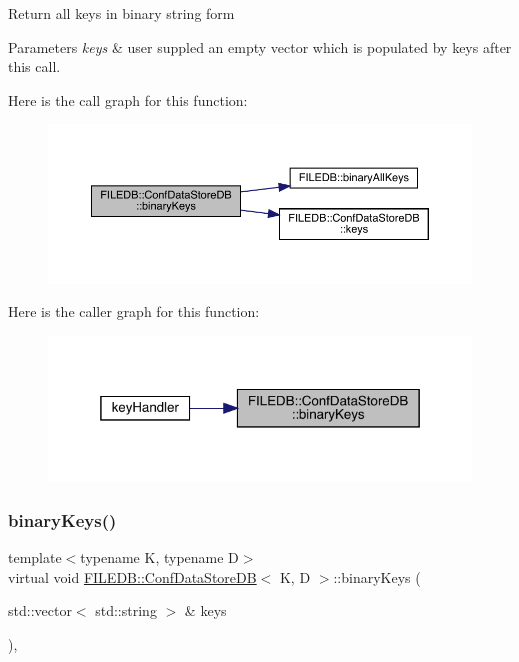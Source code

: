 Return all keys in binary string form 
\begin{DoxyParams}{Parameters}
{\em keys} & user suppled an empty vector which is populated by keys after this call. \\
\hline
\end{DoxyParams}
Here is the call graph for this function\+:
\nopagebreak
\begin{figure}[H]
\begin{center}
\leavevmode
\includegraphics[width=350pt]{d8/d19/classFILEDB_1_1ConfDataStoreDB_a1d0e8e27cd8fc6b24ece52259d1ab2b0_cgraph}
\end{center}
\end{figure}
Here is the caller graph for this function\+:
\nopagebreak
\begin{figure}[H]
\begin{center}
\leavevmode
\includegraphics[width=319pt]{d8/d19/classFILEDB_1_1ConfDataStoreDB_a1d0e8e27cd8fc6b24ece52259d1ab2b0_icgraph}
\end{center}
\end{figure}
\mbox{\label{classFILEDB_1_1ConfDataStoreDB_a1d0e8e27cd8fc6b24ece52259d1ab2b0}} 
\subsubsection{\texorpdfstring{binaryKeys()}{binaryKeys()}\hspace{0.1cm}{\footnotesize\ttfamily [2/3]}}
{\footnotesize\ttfamily template$<$typename K, typename D$>$ \\
virtual void \mbox{\hyperlink{classFILEDB_1_1ConfDataStoreDB}{F\+I\+L\+E\+D\+B\+::\+Conf\+Data\+Store\+DB}}$<$ K, D $>$\+::binary\+Keys (\begin{DoxyParamCaption}\item[{std\+::vector$<$ std\+::string $>$ \&}]{keys }\end{DoxyParamCaption})\hspace{0.3cm}{\ttfamily [inline]}, {\ttfamily [virtual]}}


